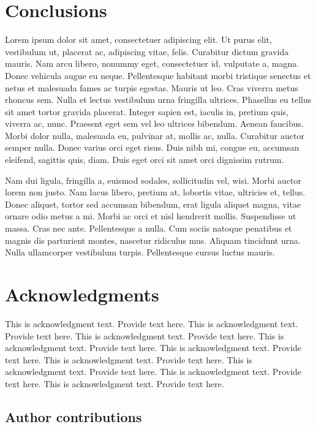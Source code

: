 \documentclass[AMA,STIX1COL]{WileyNJD-SP}
\begin{document}
\section{Conclusions}\label{sec5}

Lorem ipsum dolor sit amet, consectetuer adipiscing elit. Ut purus elit, vestibulum ut, placerat ac, adipiscing vitae,
felis. Curabitur dictum gravida mauris. Nam arcu libero, nonummy eget, consectetuer id, vulputate a, magna. Donec
vehicula augue eu neque. Pellentesque habitant morbi tristique senectus et netus et malesuada fames ac turpis egestas.
Mauris ut leo. Cras viverra metus rhoncus sem. Nulla et lectus vestibulum urna fringilla ultrices. Phasellus eu tellus
sit amet tortor gravida placerat. Integer sapien est, iaculis in, pretium quis, viverra ac, nunc. Praesent eget sem vel
leo ultrices bibendum. Aenean faucibus. Morbi dolor nulla, malesuada eu, pulvinar at, mollis ac, nulla. Curabitur
auctor semper nulla. Donec varius orci eget risus. Duis nibh mi, congue eu, accumsan eleifend, sagittis quis, diam.
Duis eget orci sit amet orci dignissim rutrum.

Nam dui ligula, fringilla a, euismod sodales, sollicitudin vel, wisi. Morbi auctor lorem non justo. Nam lacus libero,
pretium at, lobortis vitae, ultricies et, tellus. Donec aliquet, tortor sed accumsan bibendum, erat ligula aliquet magna,
vitae ornare odio metus a mi. Morbi ac orci et nisl hendrerit mollis. Suspendisse ut massa. Cras nec ante. Pellentesque
a nulla. Cum sociis natoque penatibus et magnis dis parturient montes, nascetur ridiculus mus. Aliquam tincidunt
urna. Nulla ullamcorper vestibulum turpis. Pellentesque cursus luctus mauris.


\section*{Acknowledgments}
This is acknowledgment text.\cite{Kenamond2013} Provide text here. This is acknowledgment text. Provide text here. This is acknowledgment text. Provide text here. This is acknowledgment text. Provide text here. This is acknowledgment text. Provide text here. This is acknowledgment text. Provide text here. This is acknowledgment text. Provide text here. This is acknowledgment text. Provide text here. This is acknowledgment text. Provide text here. 

\subsection*{Author contributions}
\end{document}
